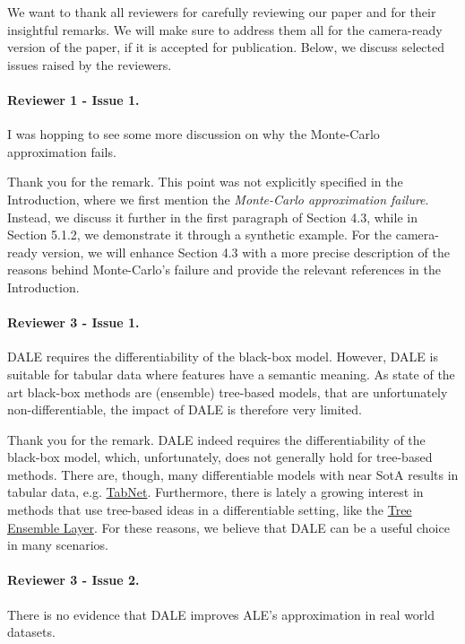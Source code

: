 \documentclass{article}
\begin{document}

\noindent
We want to thank all reviewers for carefully reviewing our paper and for their insightful remarks. We will make sure to address them all for the camera-ready version of the paper, if it is accepted for publication. Below, we  discuss selected issues raised by the reviewers.

\paragraph{Reviewer 1 - Issue 1.}

I was hopping to see some more discussion on why the Monte-Carlo approximation fails.

Thank you for the remark. This point was not explicitly specified in the Introduction, where we first mention the \textit{Monte-Carlo approximation failure}. Instead, we discuss it further in the first paragraph of Section 4.3, while in Section 5.1.2, we demonstrate it through a synthetic example. For the camera-ready version, we will enhance Section 4.3 with a more precise description of the reasons behind Monte-Carlo's failure and provide the relevant references in the Introduction.

\paragraph{Reviewer 3 - Issue 1.}

DALE requires the differentiability of the black-box model. However,
DALE is suitable for tabular data where features have a semantic
meaning. As state of the art black-box methods are (ensemble)
tree-based models, that are unfortunately non-differentiable, the
impact of DALE is therefore very limited.

\noindent
Thank you for the remark. DALE indeed requires the differentiability
of the black-box model, which, unfortunately, does not generally hold for tree-based methods. There are, though, many differentiable models with near SotA results in tabular data, e.g. \href{https://arxiv.org/pdf/1908.07442.pdf}{TabNet}. Furthermore, there is lately a growing interest in methods that use tree-based ideas in a differentiable setting, like the \href{http://proceedings.mlr.press/v119/hazimeh20a/hazimeh20a.pdf}{Tree Ensemble Layer}. For these reasons, we believe that DALE can be a useful choice in many scenarios.

\paragraph{Reviewer 3 - Issue 2.} There is no evidence that DALE improves ALE's approximation in real world datasets.
\end{document}
